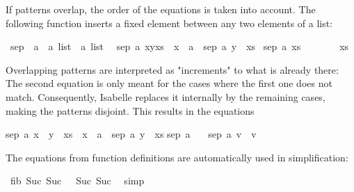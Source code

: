 \begin{isabellebody}
\begin{isamarkuptext}
  If patterns overlap, the order of the equations is taken into
  account. The following function inserts a fixed element between any
  two elements of a list:%
\end{isamarkuptext}%
\isamarkuptrue%
\isamarkupfalse%
\ sep\ {\isacharcolon}{\isacharcolon}\ {\isachardoublequoteopen}{\isacharprime}a\ {\isasymRightarrow}\ {\isacharprime}a\ list\ {\isasymRightarrow}\ {\isacharprime}a\ list{\isachardoublequoteclose}\isanewline
{}\isanewline
\ \ {\isachardoublequoteopen}sep\ a\ {\isacharparenleft}x{\isacharhash}y{\isacharhash}xs{\isacharparenright}\ {\isacharequal}\ x\ {\isacharhash}\ a\ {\isacharhash}\ sep\ a\ {\isacharparenleft}y\ {\isacharhash}\ xs{\isacharparenright}{\isachardoublequoteclose}\isanewline
{\isacharbar}\ {\isachardoublequoteopen}sep\ a\ xs\ \ \ \ \ \ \ {\isacharequal}\ xs{\isachardoublequoteclose}%
\begin{isamarkuptext}%
Overlapping patterns are interpreted as "increments" to what is
  already there: The second equation is only meant for the cases where
  the first one does not match. Consequently, Isabelle replaces it
  internally by the remaining cases, making the patterns disjoint.
  This results in the equations \begin{isabelle}%
sep\ a\ {\isacharparenleft}x\ {\isacharhash}\ y\ {\isacharhash}\ xs{\isacharparenright}\ {\isacharequal}\ x\ {\isacharhash}\ a\ {\isacharhash}\ sep\ a\ {\isacharparenleft}y\ {\isacharhash}\ xs{\isacharparenright}\isasep\isanewline%
sep\ a\ {\isacharbrackleft}{\isacharbrackright}\ {\isacharequal}\ {\isacharbrackleft}{\isacharbrackright}\isasep\isanewline%
sep\ a\ {\isacharbrackleft}v{\isacharbrackright}\ {\isacharequal}\ {\isacharbrackleft}v{\isacharbrackright}%
\end{isabelle}%
\end{isamarkuptext}%
\isamarkuptrue%
%
\begin{isamarkuptext}%
The equations from function definitions are automatically used in
  simplification:%
\end{isamarkuptext}%
\isamarkuptrue%
\isamarkupfalse%
\ {\isachardoublequoteopen}fib\ {\isacharparenleft}Suc\ {\isacharparenleft}Suc\ {}{\isacharparenright}{\isacharparenright}\ {\isacharequal}\ {\isacharparenleft}Suc\ {\isacharparenleft}Suc\ {}{\isacharparenright}{\isacharparenright}{\isachardoublequoteclose}\isanewline
%
\isadelimproof
%
\endisadelimproof
%
\isatagproof
{}\isamarkupfalse%
\ simp%
\endisatagproof
{\isafoldproof}%
%
\isadelimproof

\end{isabellebody}
